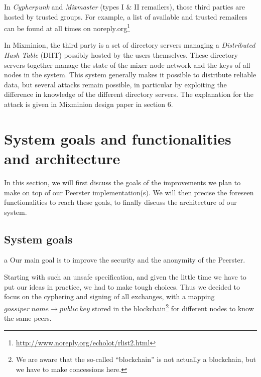 \documentclass[11pt, a4paper]{article}
\begin{document}
        In \textit{Cypherpunk} and \textit{Mixmaster} (types I \& II remailers), those third parties are hosted by trusted groups.
        For example, a list of available and trusted remailers can be found at all times on noreply.org\footnote{\url{http://www.noreply.org/echolot/rlist2.html}}

        In Mixminion\cite{mixminion}, the third party is a set of directory servers managing a \textit{Distributed Hash Table} (DHT) possibly hosted by the users themselves.
        These directory servers together manage the state of the mixer node network and the keys of all nodes in the system.
        This system generally makes it possible to distribute reliable data, but several attacks remain possible, in particular by exploiting the difference in knowledge of the different directory servers.
        The explanation for the attack is given in Mixminion design\cite{mixminion} paper in section 6.



\section{System goals and functionalities and architecture}

    In this section, we will first discuss the goals of the improvements we plan to make on top of our Peerster implementation(s).
    We will then precise the foreseen functionalities to reach these goals, to finally discuss the architecture of our system.

    \subsection{System goals}a\label{subsec:system-goals}
        Our main goal is to improve the security and the anonymity of the Peerster.

        Starting with such an unsafe specification, and given the little time we have to put our ideas in practice, we had to make tough choices.
        Thus we decided to focus on the cyphering and signing of all exchanges, with a mapping $gossiper~name \rightarrow public~key$ stored in the blockchain\footnote{We are aware that the so-called ``blockchain'' is not actually a blockchain, but we have to make concessions here.} for different nodes to know the same peers.
\end{document}
